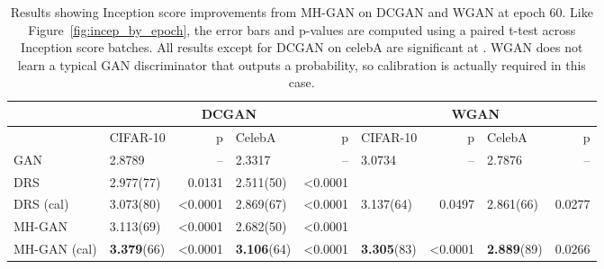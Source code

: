 \begin{table}[htbp]
\begin{center}
  \caption{{\small
    Results showing Inception score improvements from MH-GAN on DCGAN and WGAN at epoch 60.
    Like Figure~\ref{fig:incep_by_epoch}, the error bars and p-values are computed using a paired t-test across Inception score batches.
    All results except for DCGAN on celebA are significant at .
    WGAN does not learn a typical GAN discriminator that outputs a probability, so calibration is actually required in this case.
    }}
    \label{tbl:inception}
{\scriptsize
\begin{tabular}{|l|l|r|l|r||l|r|l|r|}
\toprule
~                 & \multicolumn{4}{c||}{DCGAN}                               & \multicolumn{4}{c|}{WGAN} \\
\toprule
~            & {CIFAR-10}                &      p   & CelebA                  &      p   & CIFAR-10                 &       p  & CelebA                 &       p  \\
\midrule
GAN          &        2.8789             &       -- &      2.3317             &       -- &       3.0734             &       -- &     2.7876             &       -- \\
DRS          &        2.977(77)          &   0.0131 &      2.511(50)          &  <0.0001 &               ~          &        ~ &             ~          &        ~ \\
DRS (cal)    &        3.073(80)          &  <0.0001 &      2.869(67)          &  <0.0001 &       3.137(64)          &   0.0497 &     2.861(66)          &   0.0277 \\
MH-GAN       &        3.113(69)          &  <0.0001 &      2.682(50)          &  <0.0001 &               ~          &        ~ &             ~          &        ~ \\
MH-GAN (cal) &        \textbf{3.379}(66) &  <0.0001 &      \textbf{3.106}(64) &  <0.0001 &       \textbf{3.305}(83) &  <0.0001 &     \textbf{2.889}(89) &   0.0266 \\
\bottomrule
\end{tabular}
}
\end{center}
\end{table}

